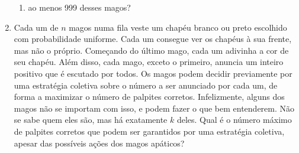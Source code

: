 \documentclass{article}
\begin{document}
\begin{enumerate}
\begin{enumerate}
    \item ao menos 999 desses magos?
    \end{enumerate}
    
    \item Cada um de $n$ magos numa fila veste um chapéu branco ou preto escolhido com probabilidade uniforme. Cada um consegue ver os chapéus à sua frente, mas não o próprio. Começando do último mago, cada um adivinha a cor de seu chapéu. Além disso, cada mago, exceto o primeiro, anuncia um inteiro positivo que é escutado por todos. Os magos podem decidir previamente por uma estratégia coletiva sobre o número a ser anunciado por cada um, de forma a maximizar o número de palpites corretos. Infelizmente, alguns dos magos não se importam com isso, e podem fazer o que bem entenderem. Não se sabe quem eles são, mas há exatamente $k$ deles. Qual é o número máximo de palpites corretos que podem ser garantidos por uma estratégia coletiva, apesar das possíveis ações dos magos apáticos?
\end{enumerate}
\end{document}
